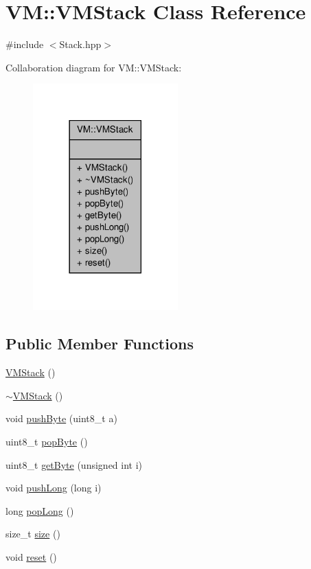 \hypertarget{class_v_m_1_1_v_m_stack}{\section{V\-M\-:\-:V\-M\-Stack Class Reference}
\label{class_v_m_1_1_v_m_stack}
}


{\ttfamily \#include $<$Stack.\-hpp$>$}



Collaboration diagram for V\-M\-:\-:V\-M\-Stack\-:
\nopagebreak
\begin{figure}[H]
\begin{center}
\leavevmode
\includegraphics[width=158pt]{class_v_m_1_1_v_m_stack__coll__graph}
\end{center}
\end{figure}
\subsection*{Public Member Functions}
\begin{DoxyCompactItemize}
\item 
\hyperlink{class_v_m_1_1_v_m_stack_a5199debb1a2cd4f0f57727b1917b65f9}{V\-M\-Stack} ()
\item 
\hyperlink{class_v_m_1_1_v_m_stack_a9f34664e29b6b4427680abe670192c28}{$\sim$\-V\-M\-Stack} ()
\item 
void \hyperlink{class_v_m_1_1_v_m_stack_a5d738a0cbdc7425f4b03218b36548127}{push\-Byte} (uint8\-\_\-t a)
\item 
uint8\-\_\-t \hyperlink{class_v_m_1_1_v_m_stack_a7de1e1206b86c1488cb812ab20cdb376}{pop\-Byte} ()
\item 
uint8\-\_\-t \hyperlink{class_v_m_1_1_v_m_stack_a5acde10ad80f6562af55204eb237abd8}{get\-Byte} (unsigned int i)
\item 
void \hyperlink{class_v_m_1_1_v_m_stack_ae71cee99566fb18c9d28b63761e80433}{push\-Long} (long i)
\item 
long \hyperlink{class_v_m_1_1_v_m_stack_a4c81b9be069d03e6c1540940ca2fba5f}{pop\-Long} ()
\item 
size\-\_\-t \hyperlink{class_v_m_1_1_v_m_stack_a5ae9c3f1460911c8b4fb8957fe856ca8}{size} ()
\item 
void \hyperlink{class_v_m_1_1_v_m_stack_acace9635092448afaf98c0d57f693e5f}{reset} ()
\end{DoxyCompactItemize}


